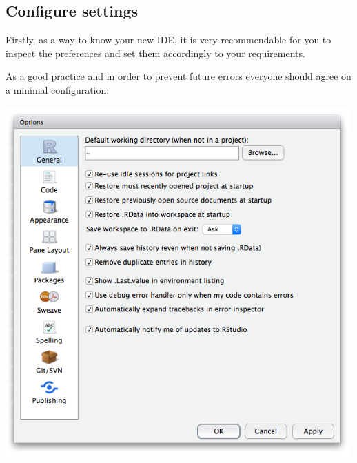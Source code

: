 \documentclass[]{article}
\begin{document}
\subsection{Configure settings}\label{configure-settings}

Firstly, as a way to know your new IDE, it is very recommendable for you
to inspect the preferences and set them accordingly to your
requirements.

As a good practice and in order to prevent future errors everyone should
agree on a minimal configuration:

\begin{center}\includegraphics[width=500px]{figures/rstudio_settings} \end{center}
\end{document}

